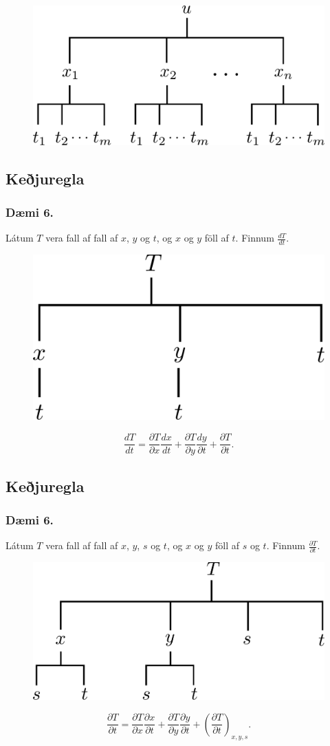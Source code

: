 \begin{figure}[h!]
           \centering
            \includegraphics[width=0.45\linewidth]{chain3}
    \end{figure}


\subsection{Keðjuregla} 

\subsubsection{Dæmi 6.}
Látum $T$ vera fall af fall af $x$, $y$ og $t$, og $x$ og $y$ föll af $t$. Finnum $\frac{ dT}{dt}$.

\begin{figure}[h!]
           \centering
            \includegraphics[width=0.35\linewidth]{chain5}
    \end{figure}
$$\frac{d T}{d t} = \frac{\partial T}{\partial x} \frac{d x}{d t} +\frac{\partial T}{\partial y} \frac{d y}{\partial t} + \frac{\partial T}{\partial t} .$$


\subsection{Keðjuregla} 

\subsubsection{Dæmi 6.}
Látum $T$ vera fall af fall af $x$, $y$, $s$ og $t$, og $x$ og $y$ föll af $s$ og $t$. Finnum $\frac{ \partial T}{\partial t}$.

\begin{figure}[h!]
           \centering
            \includegraphics[width=0.45\linewidth]{chain6}
    \end{figure}
$$\frac{\partial T}{\partial t} = \frac{\partial T}{\partial x} \frac{\partial x}{\partial t} +\frac{\partial T}{\partial y} \frac{\partial y}{\partial t} + \left(\frac{\partial T}{\partial t}\right)_{x,y,s} .$$


